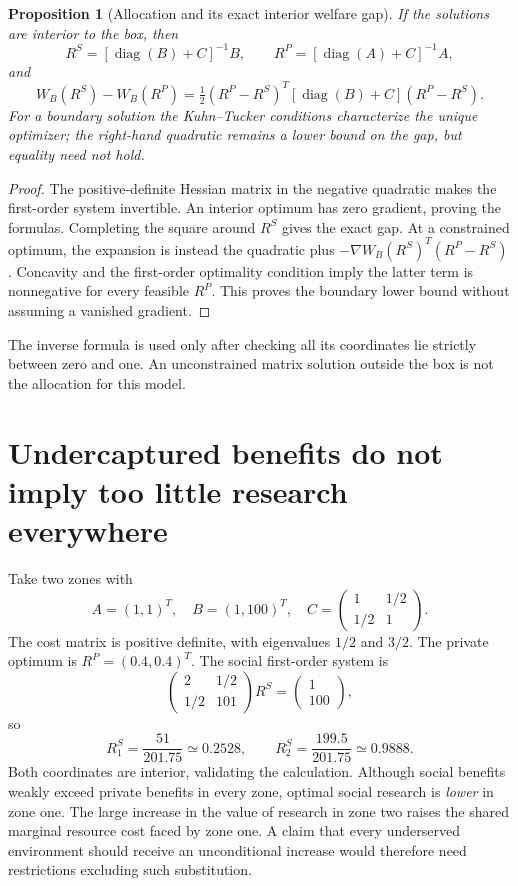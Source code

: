 \documentclass[11pt]{article}
\newtheorem{proposition}{Proposition}
\begin{document}
\begin{proposition}[Allocation and its exact interior welfare gap]
If the solutions are interior to the box, then
\[
 R^S=[\operatorname{diag}(B)+C]^{-1}B,\qquad
 R^P=[\operatorname{diag}(A)+C]^{-1}A,
\]
and
\[
 W_B(R^S)-W_B(R^P)
 =\tfrac12(R^P-R^S)^T[\operatorname{diag}(B)+C](R^P-R^S).
\]
For a boundary solution the Kuhn--Tucker conditions characterize the unique optimizer; the right-hand quadratic remains a lower bound on the gap, but equality need not hold.
\end{proposition}
\begin{proof}
The positive-definite Hessian matrix in the negative quadratic makes the first-order system invertible. An interior optimum has zero gradient, proving the formulas. Completing the square around $R^S$ gives the exact gap. At a constrained optimum, the expansion is instead the quadratic plus $-\nabla W_B(R^S)^T(R^P-R^S)$. Concavity and the first-order optimality condition imply the latter term is nonnegative for every feasible $R^P$. This proves the boundary lower bound without assuming a vanished gradient.
\end{proof}

The inverse formula is used only after checking all its coordinates lie strictly between zero and one. An unconstrained matrix solution outside the box is not the allocation for this model.

\section*{Undercaptured benefits do not imply too little research everywhere}
Take two zones with
\[
 A=(1,1)^T,\quad B=(1,100)^T,\quad
 C=\begin{pmatrix}1&1/2\\1/2&1\end{pmatrix}.
\]
The cost matrix is positive definite, with eigenvalues $1/2$ and $3/2$. The private optimum is $R^P=(0.4,0.4)^T$. The social first-order system is
\[
 \begin{pmatrix}2&1/2\\1/2&101\end{pmatrix}R^S
 =\begin{pmatrix}1\\100\end{pmatrix},
\]
so
\[
 R_1^S=\frac{51}{201.75}\simeq0.2528,
 \qquad R_2^S=\frac{199.5}{201.75}\simeq0.9888.
\]
Both coordinates are interior, validating the calculation. Although social benefits weakly exceed private benefits in every zone, optimal social research is \emph{lower} in zone one. The large increase in the value of research in zone two raises the shared marginal resource cost faced by zone one. A claim that every underserved environment should receive an unconditional increase would therefore need restrictions excluding such substitution.
\end{document}
